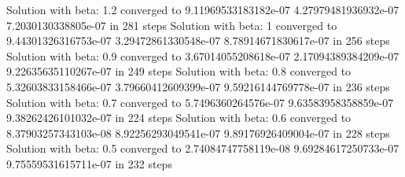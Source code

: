 Solution with beta: 1.2 converged to 9.11969533183182e-07  4.27979481936932e-07  7.2030130338805e-07 in 281 steps
Solution with beta: 1 converged to 9.44301326316753e-07  3.29472861330548e-07  8.78914671830617e-07 in 256 steps
Solution with beta: 0.9 converged to 3.67014055208618e-07  2.17094389384209e-07  9.22635635110267e-07 in 249 steps
Solution with beta: 0.8 converged to 5.32603833158466e-07  3.79660412609399e-07  9.59216144769778e-07 in 236 steps
Solution with beta: 0.7 converged to 5.7496360264576e-07  9.63583958358859e-07  9.38262426101032e-07 in 224 steps
Solution with beta: 0.6 converged to 8.37903257343103e-08  8.92256293049541e-07  9.89176926409004e-07 in 228 steps
Solution with beta: 0.5 converged to 2.74084747758119e-08  9.69284617250733e-07  9.75559531615711e-07 in 232 steps

